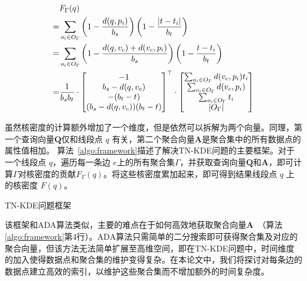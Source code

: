 \begin{align}
	\label{eq:aggregate}
	&F_\Gamma(q) \notag \\
	=& \sum_{o_i \in O_\Gamma}
	\left(1 - \frac{d(q,p_i)}{b_s}\right)
	\left(1 - \frac{\vert t - t_i \vert}{b_t}\right) \notag \\
	=& \sum_{o_i \in O_\Gamma}
	\left(1-\frac{d(q, v_c) + d(v_c, p_i)}{b_s}\right)
	\left(1-\frac{t - t_i}{b_t}\right) \\
	=& \frac{1}{b_sb_t} \cdot 
	\begin{bmatrix}
		-1 \\
		b_s-d(q, v_c) \\
		-(b_t-t) \\
		(b_s-d(q, v_c))(b_t-t) \\
	\end{bmatrix}^\top \cdot
	\begin{bmatrix}
		\sum_{o_i \in O_\Gamma} d(v_c,p_i)t_i \\
		\sum_{o_i \in O_\Gamma} d(v_c,p_i) \\
		\sum_{o_i \in O_\Gamma} t_i \\
		\vert O_\Gamma \vert 
	\end{bmatrix} \notag
\end{align}

虽然核密度的计算额外增加了一个维度，但是依然可以拆解为两个向量。同理，第一个查询向量$\mathbf{Q}$仅和线段点 $q$ 有关，第二个聚合向量$\mathbf{A}$是聚合集中的所有数据点的属性值相加。
算法~\ref{algo:framework}描述了解决TN-KDE问题的主要框架。对于一个线段点 $q$，遍历每一条边 $e$上的所有聚合集$\Gamma$，并获取查询向量$\mathbf{Q}$和$\mathbf{A}$，即可计算$\Gamma$对核密度的贡献$F_\Gamma(q)$。将这些核密度累加起来，即可得到结果线段点 $q$ 上的核密度 $F(q)$。

\begin{algorithm}[h]
	\caption{TN-KDE问题框架}
	\label{algo:framework}
	\DontPrintSemicolon
	
\end{algorithm}

该框架和ADA算法类似，主要的难点在于如何高效地获取聚合向量$\mathbf{A}$~（算法\ref{algo:framework}第4行）。ADA算法只需简单的二分搜索即可获得聚合集及对应的聚合向量，但该方法无法简单扩展至高维空间，即在TN-KDE问题中，时间维度的加入使得数据点和聚合集的维护变得复杂。在本论文中，我们将探讨对每条边的数据点建立高效的索引，以维护这些聚合集而不增加额外的时间复杂度。